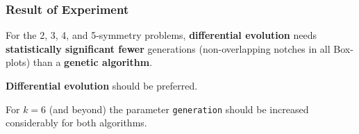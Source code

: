 \begin{frame}
\frametitle{
Result of Experiment
}
For the 2, 3, 4, and 5-symmetry problems,
{\bf differential evolution} needs {\bf statistically significant fewer} generations
(non-overlapping notches in all Box-plots) than a {\bf genetic algorithm}.
 
{\bf Differential evolution} should be preferred.
 
For $k=6$ (and beyond) the parameter {\tt generation} should be increased considerably
for both algorithms.
\end{frame}